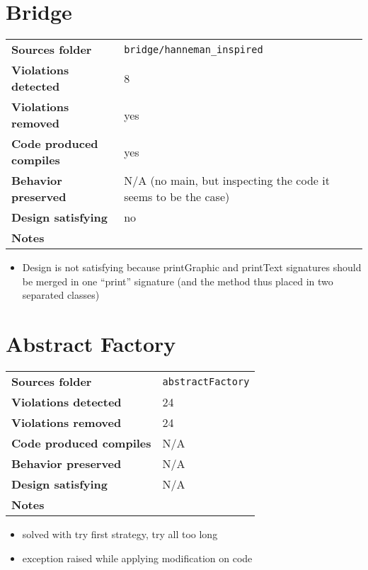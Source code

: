 \documentclass[french]{article}
\begin{document}
\section*{Bridge}
\noindent\begin{tabular}{ l p{12cm} }
\textbf{Sources folder} &  \texttt{bridge/hanneman\_inspired}\\
\textbf{Violations detected} & 8\\
\textbf{Violations removed} & yes\\
\textbf{Code produced compiles} & yes\\
\textbf{Behavior preserved} & N/A (no main, but inspecting the code it seems to be the case)\\
\textbf{Design satisfying} & no\\
\textbf{Notes} & \\
\end{tabular}

\begin{itemize}
\item Design is not satisfying because printGraphic and printText signatures should be merged in one ``print'' signature (and the method thus placed in two separated classes)
\end{itemize}

\section*{Abstract Factory}
\noindent\begin{tabular}{ l p{12cm} }
\textbf{Sources folder} &  \texttt{abstractFactory}\\
\textbf{Violations detected} & 24\\
\textbf{Violations removed} & 24\\
\textbf{Code produced compiles} & N/A\\
\textbf{Behavior preserved} & N/A \\
\textbf{Design satisfying} & N/A\\
\textbf{Notes} & \\
\end{tabular}

\begin{itemize}
\item solved with try first strategy, try all too long
\item exception raised while applying modification on code
\end{itemize}
\end{document}
